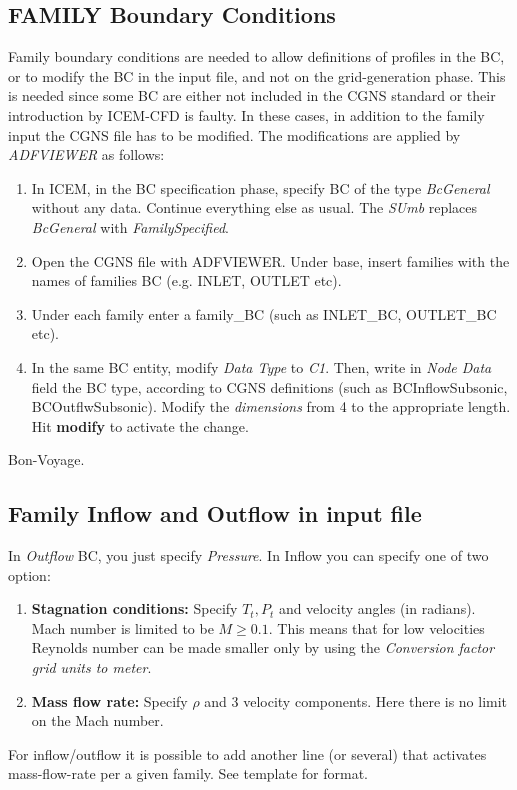 \documentclass[12pt,epsf,colordvi]{article}
\begin{document}
\subsection{FAMILY Boundary Conditions}
%
Family boundary conditions are needed to allow definitions of profiles in the BC, or
to modify the BC in the input file, and not on the grid-generation phase. This is needed since some BC are either not included in the CGNS standard or their introduction by ICEM-CFD is faulty. In these cases, in addition to the family input the CGNS file has to be modified. The modifications are applied by  {\it ADFVIEWER } as follows:
\begin{enumerate}
  \item In ICEM, in the BC specification phase, specify BC of the type
	{\it BcGeneral} without any data. Continue everything else as
	usual. The {\it SUmb} replaces {\it BcGeneral}  with {\it FamilySpecified}.
%
  \item	Open the CGNS file with ADFVIEWER. Under base, insert families with the names of families BC (e.g. INLET, 	OUTLET etc). 
%
  \item Under each family enter a family\_BC (such as INLET\_BC,
	OUTLET\_BC etc).
%
  \item In the same BC entity, modify {\it Data Type} to {\it C1}. Then, write in
	{\it Node Data} field the BC type, according to CGNS definitions 
	(such as BCInflowSubsonic, BCOutflwSubsonic). Modify the {\it dimensions} from 4 to the appropriate length. Hit {\bf modify} to activate the change.
%
\end{enumerate}
Bon-Voyage.

\subsection{Family Inflow and Outflow in input file}

In {\it Outflow} BC, you just specify {\it Pressure}. In Inflow you
can specify one of two option:

\begin{enumerate}
  \item {\bf Stagnation conditions:} Specify \(T_t , P_t\) and velocity angles (in radians). Mach
   number is limited to be \(M \ge 0.1\). This means that for low velocities
   Reynolds number can be made smaller only by using the 
  {\it Conversion factor grid units to meter}.
%
 \item {\bf Mass flow rate:} Specify \(\rho\) and 3 velocity components. Here there is
   no limit on the Mach number. 
\end{enumerate}
%
For inflow/outflow it is possible to add another line (or several) that activates mass-flow-rate per a given family. See template for format.
\end{document}
